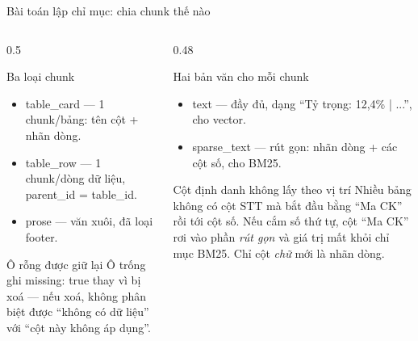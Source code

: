 \documentclass[aspectratio=169,11pt]{beamer}
\newcommand{\src}[1]{{\footnotesize\ttfamily #1}}
\begin{document}
\begin{frame}{Bài toán lập chỉ mục: chia chunk thế nào}
  \begin{columns}[T]
    \begin{column}{0.5\textwidth}
      \begin{block}{\small Ba loại chunk}
        \begin{itemize}\footnotesize
          \item \src{table\_card} --- 1 chunk/bảng: tên cột + nhãn dòng.
          \item \src{table\_row} --- 1 chunk/dòng dữ liệu, \src{parent\_id = table\_id}.
          \item \src{prose} --- văn xuôi, đã loại footer.
        \end{itemize}
      \end{block}
      \begin{block}{\small Ô rỗng được giữ lại}
        Ô trống ghi \src{missing: true} thay vì bị xoá — nếu xoá, không phân biệt
        được ``không có dữ liệu'' với ``cột này không áp dụng''.
      \end{block}
    \end{column}
    \begin{column}{0.48\textwidth}
      \begin{block}{\small Hai bản văn cho mỗi chunk}
        \begin{itemize}\footnotesize
          \item \src{text} --- đầy đủ, dạng ``Tỷ trọng: 12,4\% | ...'', cho vector.
          \item \src{sparse\_text} --- rút gọn: nhãn dòng + các cột số, cho BM25.
        \end{itemize}
      \end{block}
      \begin{block}{\small Cột định danh không lấy theo vị trí}
        Nhiều bảng không có cột STT mà bắt đầu bằng ``Ma CK'' rồi tới cột số.
        Nếu cắm số thứ tự, cột ``Ma CK'' rơi vào phần \emph{rút gọn} và giá trị
        mất khỏi chỉ mục BM25. Chỉ cột \emph{chữ} mới là nhãn dòng.
      \end{block}
    \end{column}
  \end{columns}
\end{frame}
\end{document}

